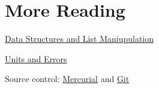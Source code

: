 \documentclass[justified, nobib]{tufte-handout}
\newcommand{\listTutorialLink}
  {https://docs.python.org/2/tutorial/datastructures.html}
\newcommand{\pintLink}{http://pint.readthedocs.org/en/0.6/}
\newcommand{\hgLink}{http://mercurial.selenic.com/}
\newcommand{\gitLink}{http://git-scm.com/}
\newcommand{\lambdaTutorialLink}
  {https://pythonconquerstheuniverse.wordpress.com/2011/08/29/lambda_tutorial/}
\newcommand{\functionalProgrammingLink}
  {http://www.ibm.com/developerworks/library/l-prog/}
\begin{document}
\pagebreak

\section*{More Reading}
\begin{description}
\item \href{\listTutorialLink}{Data Structures and List Maniupulation}

\item \href{\pintLink}{Units and Errors}

\item Source control: \href{\hgLink}{Mercurial} and \href{\gitLink}{Git}


\end{description}
\end{document}
